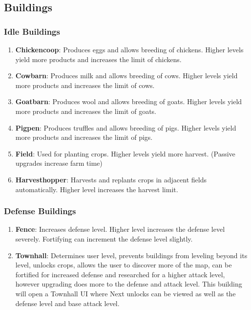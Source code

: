 \documentclass[12pt]{article}
\begin{document}
\subsection{Buildings}

\subsubsection{Idle Buildings}

\begin{enumerate}
    \item \textbf{Chickencoop}: Produces eggs and allows breeding of chickens. Higher levels yield more products and increases the limit of chickens.
    \item \textbf{Cowbarn}: Produces milk and allows breeding of cows. Higher levels yield more products and increases the limit of cows.
    \item \textbf{Goatbarn}: Produces wool and allows breeding of goats. Higher levels yield more products and increases the limit of goats.
    \item \textbf{Pigpen}: Produces truffles and allows breeding of pigs. Higher levels yield more products and increases the limit of pigs.
    \item \textbf{Field}: Used for planting crops. Higher levels yield more harvest. (Passive upgrades increase farm time)
    \item \textbf{Harvesthopper}: Harvests and replants crops in adjacent fields automatically. Higher level increases the harvest limit.
\end{enumerate}

\subsubsection{Defense Buildings}

\begin{enumerate}
    \item \textbf{Fence}:
    Increases defense level. Higher level increases the defense level severely. Fortifying can increment the defense level slightly.
    \item \textbf{Townhall}: Determines user level, prevents buildings from leveling beyond its level, unlocks crops, allows the user to discover more of the map, can be fortified for increased defense and researched for a higher attack level, however upgrading does more to the defense and attack level. This building will open a Townhall UI where Next unlocks can be viewed as well as the defense level and base attack level.
\end{enumerate}
\end{document}
